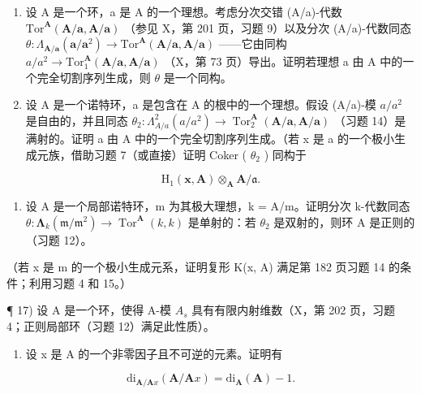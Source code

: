 \begin{enumerate}
\def\labelenumi{\arabic{enumi})}
\setcounter{enumi}{13}
\item
  设 A 是一个环，a 是 A 的一个理想。考虑分次交错 (A/a)-代数 \(\mathrm{Tor}^{\mathbf{A}}(\mathbf{A}/\mathbf{a}, \mathbf{A}/\mathbf{a})\) （参见 X，第 201 页，习题 9）以及分次 (A/a)-代数同态 \(\theta: \Lambda_{\mathbf{A}/\mathbf{a}}(\mathbf{a}/\mathbf{a}^{2}) \to \mathrm{Tor}^{\mathbf{A}}(\mathbf{A}/\mathbf{a}, \mathbf{A}/\mathbf{a})\) ——它由同构 \(a/a^{2} \to \mathrm{Tor}_{1}^{\mathbf{A}}(\mathbf{A}/\mathbf{a}, \mathbf{A}/\mathbf{a})\) （X，第 73 页）导出。证明若理想 a 由 A 中的一个完全切割序列生成，则 \(\theta\) 是一个同构。
\item
  设 A 是一个诺特环，a 是包含在 A 的根中的一个理想。假设 (A/a)-模 \(a/a^{2}\) 是自由的，并且同态 \(\theta_{2}: \Lambda_{A/a}^{2}(a/a^{2}) \to \operatorname{Tor}_{2}^{\mathbf{A}}(\mathbf{A}/\mathbf{a}, \mathbf{A}/\mathbf{a})\) （习题 14）是满射的。证明 a 由 A 中的一个完全切割序列生成。（若 x 是 a 的一个极小生成元族，借助习题 7（或直接）证明 Coker ( \(\theta_{2}\) ) 同构于
\end{enumerate}

\[
\mathrm{H} _ {1} (\boldsymbol {x}, \mathbf {A}) \otimes_ {\mathbf {A}} \mathbf {A} / \mathfrak {a}.
\]

\begin{enumerate}
\def\labelenumi{\arabic{enumi})}
\setcounter{enumi}{15}
\tightlist
\item
  设 A 是一个局部诺特环，m 为其极大理想，k = A/m。证明分次 k-代数同态 \(\theta : \symbf{\Lambda}_{k}(\mathfrak{m}/\mathfrak{m}^{2}) \to \operatorname{Tor}^{\mathbf{A}}(k, k)\) 是单射的：若 \(\theta_{2}\) 是双射的，则环 A 是正则的（习题 12）。
\end{enumerate}

（若 x 是 m 的一个极小生成元系，证明复形 K(x, A) 满足第 182 页习题 14 的条件；利用习题 4 和 15。）

¶ 17) 设 A 是一个环，使得 A-模 \(A_{s}\) 具有有限内射维数（X，第 202 页，习题 4；正则局部环（习题 12）满足此性质）。

\begin{enumerate}
\def\labelenumi{\alph{enumi})}
\tightlist
\item
  设 x 是 A 的一个非零因子且不可逆的元素。证明有
\end{enumerate}

\[
\mathrm{di} _ {\mathbf {A} / \mathbf {A} x} (\mathbf {A} / \mathbf {A} x) = \mathrm{di} _ {\mathbf {A}} (\mathbf {A}) - 1.
\]


